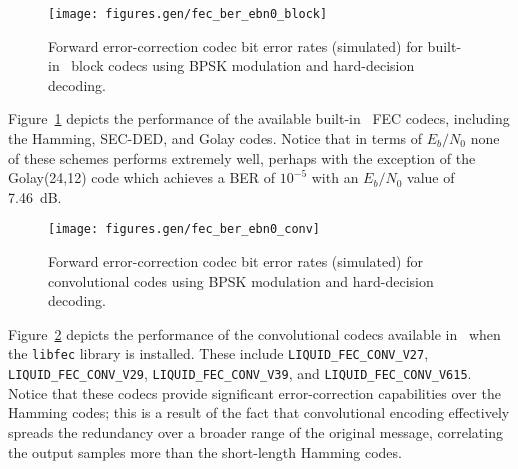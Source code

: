 \begin{figure}
\centering
\texttt{[image: figures.gen/fec\_ber\_ebn0\_block]}
\caption{Forward error-correction codec bit error rates (simulated)
         for built-in \liquid\ block codecs
         using BPSK modulation and hard-decision decoding.}
\label{fig:fec:block_ber}
\end{figure}
%
Figure~\ref{fig:fec:block_ber} depicts the performance of the
available built-in \liquid\ FEC codecs, including
the Hamming, SEC-DED, and Golay codes.
Notice that in terms of $E_b/N_0$ none of these schemes performs
extremely well,
perhaps with the exception of the Golay(24,12) code which achieves a BER
of $10^{-5}$ with an $E_b/N_0$ value of 7.46~dB.


\begin{figure}
\centering
\texttt{[image: figures.gen/fec\_ber\_ebn0\_conv]}
\caption{Forward error-correction codec bit error rates (simulated)
         for convolutional codes
         using BPSK modulation and hard-decision decoding.}
\label{fig:fec:conv_ber}
\end{figure}
%
Figure~\ref{fig:fec:conv_ber} depicts the performance of the
convolutional codecs available in \liquid\ when the {\tt libfec} library
is installed.
These include
{\tt LIQUID\_FEC\_CONV\_V27},
{\tt LIQUID\_FEC\_CONV\_V29},
{\tt LIQUID\_FEC\_CONV\_V39}, and
{\tt LIQUID\_FEC\_CONV\_V615}.
Notice that these codecs provide significant error-correction
capabilities over the Hamming codes;
this is a result of the fact that convolutional encoding effectively
spreads the redundancy over a broader range of the original message,
correlating the output samples more than the short-length Hamming codes.


